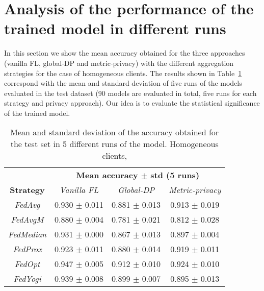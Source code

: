 \documentclass[5p,times]{elsarticle}
\begin{document}
\section{Analysis of the performance of the trained model in different runs}\label{sec:5runs}

In this section we show the mean accuracy obtained for the three approaches (vanilla FL, global-DP and metric-privacy) with the different aggregation strategies for the case of homogeneous clients. The results shown in Table~\ref{tab:5runs_iid} correspond with the mean and standard deviation of five runs of the models evaluated in the test dataset (90 models are evaluated in total, five runs for each strategy and privacy approach). Our idea is to evaluate the statistical significance of the trained model.

\begin{table}[ht]
    \centering
    \begin{tabular}{cccc}
         \toprule
          & \multicolumn{3}{c}{\textbf{Mean accuracy $\pm$ std (5 runs)}} \\
         \cmidrule{2-4}
         \textbf{Strategy} & \textit{Vanilla FL} & \textit{Global-DP} & \textit{Metric-privacy}\\
         \midrule
         \textit{FedAvg} & 0.930 $\pm$ 0.011 & 0.881 $\pm$ 0.013 & 0.913 $\pm$ 0.019 \\ 
         \textit{FedAvgM} & 0.880 $\pm$ 0.004 & 0.781 $\pm$ 0.021 & 0.812 $\pm$ 0.028 \\ 
         \textit{FedMedian} & 0.931 $\pm$ 0.000 & 0.867 $\pm$ 0.013 & 0.897 $\pm$ 0.004 \\ 
         \textit{FedProx} & 0.923 $\pm$ 0.011 & 0.880 $\pm$ 0.014 & 0.919 $\pm$ 0.011 \\ 
         \textit{FedOpt} & 0.947 $\pm$ 0.005 & 0.912 $\pm$ 0.010 & 0.924 $\pm$ 0.010 \\
         \textit{FedYogi} & 0.939 $\pm$ 0.008 & 0.899 $\pm$ 0.007 & 0.895 $\pm$ 0.013 \\ 
         \bottomrule
    \end{tabular}%
    \caption{Mean and standard deviation of the accuracy obtained for the test set in 5 different runs of the model. Homogeneous clients,}
    \label{tab:5runs_iid}
\end{table}
\end{document}
